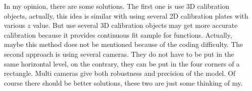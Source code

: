In my opinion, there are some solutions. The first one is use 3D calibration objects, actually, this idea is similar with using several 2D calibration plates with various $z$ value. But use several 3D calibration objects may get more accurate calibration because it provides continuous fit sample for functions. Actually, maybe this method does not be mentioned because of the coding difficulty. The second approach is using several cameras. They do not have to be put in the same horizontal level, on the contrary, they can be put in the four corners of a rectangle. Multi cameras give both robustness and precision of the model. Of course there should be better solutions, these two are just some thinking of my.


